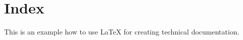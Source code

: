 \documentclass{report}
\begin{document}
\chapter{Index}
\blindtext
\par	
This is an example how to use \LaTeX {} for creating technical documentation. 
\par
\blindtext
\printindex
\end{document}

